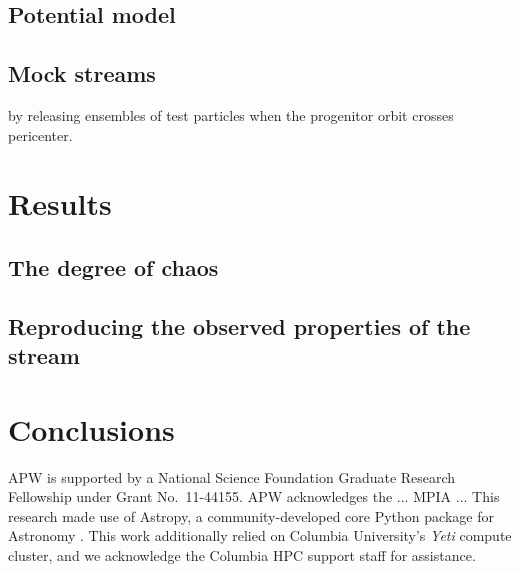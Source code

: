 \documentclass[letterpaper,12pt,preprint]{aastex}
\begin{document}
\subsection{Potential model}\label{sec:potential}

\subsection{Mock streams}\label{sec:mocks}

by releasing ensembles of test particles when the progenitor orbit crosses pericenter.

\section{Results}

\subsection{The degree of chaos}\label{sec:results1}

\subsection{Reproducing the observed properties of the stream}\label{sec:results2}

\section{Conclusions}\label{sec:conclusions}

\acknowledgements
APW is supported by a National Science Foundation Graduate Research Fellowship under Grant No.\ 11-44155.
APW acknowledges the ... MPIA ...
This research made use of Astropy, a community-developed core Python package for Astronomy \citep{astropy13}.
This work additionally relied on Columbia University's \emph{Yeti} compute cluster, and we acknowledge the Columbia HPC support staff for assistance. \\

%
%
\end{document}
